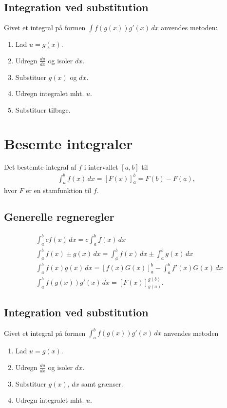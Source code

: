 \subsection{Integration ved substitution}
Givet et integral på formen $\int f(g(x))g'(x)\, dx$ anvendes metoden:
\begin{enumerate}
	\item Lad $u=g(x)$.
	\item Udregn $\frac{du}{dx}$ og isoler $dx$.
	\item Substituer $g(x)$ og $dx$.
	\item Udregn integralet mht. $u$.
	\item Substituer tilbage.
\end{enumerate}
\section{Besemte integraler}
Det bestemte integral af $f$ i intervallet $[a,b]$ til
\begin{align*}
\int_a^b f(x)\, dx =[F(x)]_a^b=F(b)-F(a),
\end{align*}
hvor $F$ er en stamfunktion til $f$.
\subsection{Generelle regneregler}
\begin{align*}
&\int_a^b cf(x) \, d x=c\int_a^b f(x)\, dx\\
&\int_a^b \!\!f(x)\pm g(x) \, d x=\int_a^b\!\!f(x)\, dx\pm \int_a^b\!\! g(x) \, dx\\
&\int_a^b\!\!\! \!\!\!f(x)g(x)\, dx\!\!=\!\![f(x)G(x)]_a^b\!\!-\!\!\!\!\int_a^b\!\!\!\!\!\! f'(x)G(x)\, dx\\
&\int_a^b f(g(x))g'(x) \, dx=[F(x)]_{g(a)}^{g(b)}.
\end{align*}
\subsection{Integration ved substitution}
Givet et integral på formen $\int_a^b f(g(x))g'(x)\, dx$ anvendes metoden
	\begin{enumerate}
	\item Lad $u=g(x)$.
	\item Udregn $\frac{du}{dx}$ og isoler $dx$.
	\item Substituer $g(x)$, $dx$ samt grænser.
	\item Udregn integralet mht. $u$.
\end{enumerate}